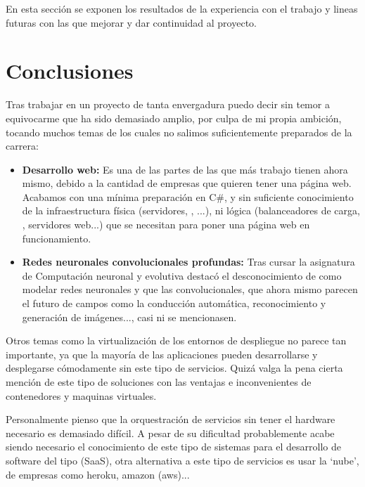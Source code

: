 
En esta sección se exponen los resultados de la experiencia con el trabajo y lineas futuras con las que mejorar y dar continuidad al proyecto.

\section{Conclusiones}

Tras trabajar en un proyecto de tanta envergadura puedo decir sin temor a equivocarme que ha sido demasiado amplio, por culpa de mi propia ambición, tocando muchos temas de los cuales no salimos suficientemente preparados de la carrera:

\begin{itemize}
\item \textbf{Desarrollo web:} Es una de las partes de las que más trabajo tienen ahora mismo, debido a la cantidad de empresas que quieren tener una página web. Acabamos con una mínima preparación en C#, y sin suficiente conocimiento de la infraestructura física (servidores, , ...), ni lógica (balanceadores de carga, , servidores web...) que se necesitan para poner una página web en funcionamiento.
\item \textbf{Redes neuronales convolucionales profundas:} Tras cursar la asignatura de Computación neuronal y evolutiva destacó el desconocimiento de como modelar redes neuronales y que las convolucionales, que ahora mismo parecen el futuro de campos como la conducción automática, reconocimiento y generación de imágenes..., casi ni se mencionasen.
\end{itemize}

Otros temas como la virtualización de los entornos de despliegue no parece tan importante, ya que la mayoría de las aplicaciones pueden desarrollarse y desplegarse cómodamente sin este tipo de servicios. Quizá valga la pena cierta mención de este tipo de soluciones con las ventajas e inconvenientes de contenedores y maquinas virtuales. 

Personalmente pienso que la orquestración de servicios sin tener el hardware necesario es demasiado difícil. A pesar de su dificultad probablemente acabe siendo necesario el conocimiento de este tipo de sistemas para el desarrollo de software del tipo  (SaaS), otra alternativa a este tipo de servicios es usar la `nube', de empresas como heroku, amazon (aws)...

